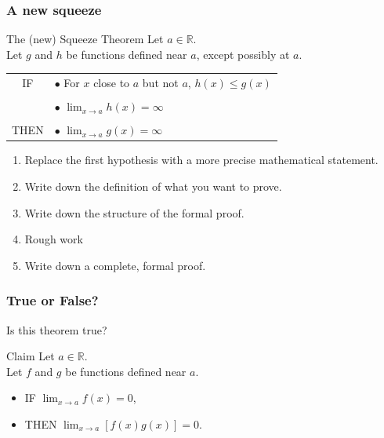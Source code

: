 \documentclass[14pt]{beamer}
\begin{document}
\begin{frame}[t]
	\frametitle{A new squeeze}
	\fontsize{13}{13}\selectfont
	\begin{block}{The (new) Squeeze Theorem}
		Let $a \in \mathbb{R}$. \\ Let $g$ and $h$ be functions defined near $a$, except
		possibly at $a$.

		\vspace{.2cm}
		\begin{tabular}{cl}
			IF            & $\bullet$ {For $x$ close to $a$ but not $a$,} \; $\displaystyle %
h(x) \leq g(x)$ \\
			\vspace{-.2cm} \\
			              & $\bullet$ $\displaystyle \lim_{x \to a}h(x) = \infty$                                                                                      \\
			\vspace{-.1cm} \\
			THEN          & $\bullet$ $\displaystyle \lim_{x \to a}g(x) = \infty$
		\end{tabular}
	\end{block}

	\begin{enumerate}

		\item Replace the first hypothesis with a more precise mathematical statement.

		\item Write down the definition of what you want to prove.

		\item Write down the structure of the formal proof.

		\item Rough work

		\item Write down a complete, formal proof.
	\end{enumerate}
\end{frame}

\begin{frame}
	\frametitle{True or False?}

	\vfill

	Is this theorem true?

	\vfill

	\begin{block}{Claim}
		Let $a \in \mathbb{R}$. \\ Let $f$ and $g$ be functions defined near $a$. \\
		\begin{itemize}
			\item IF $\displaystyle \lim_{x \to a}f(x) = 0$,

			\item THEN $\displaystyle \lim_{x \to a}\left[ f(x) g(x) \right] = 0$.
		\end{itemize}
	\end{block}

	\vfill
\end{frame}
\end{document}
